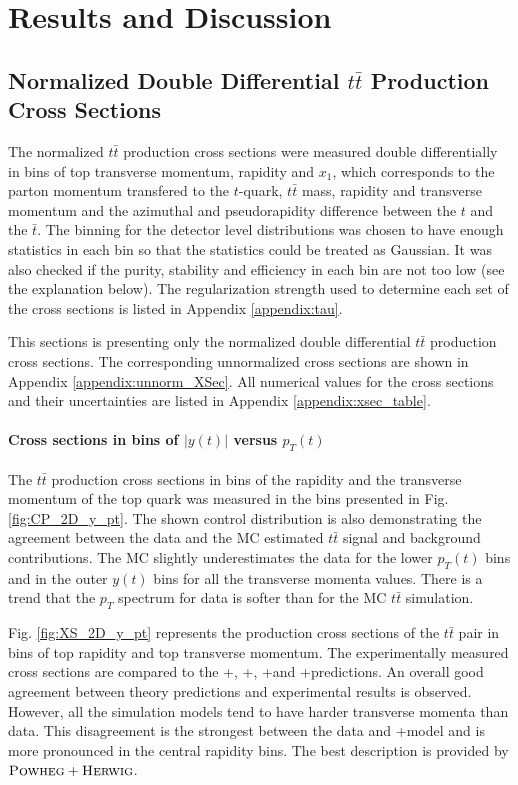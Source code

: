 \chapter{Results and Discussion}\label{chapt:results}

\section{Normalized Double Differential $t\bar{t}$ Production Cross Sections}\label{ssec:xsec_mes}

The normalized $t\bar{t}$ production cross sections were measured double differentially in bins of top transverse momentum, rapidity and  $x_{1}$,
which corresponds to the parton momentum transfered to the $t$-quark,
$t\bar{t}$ mass, rapidity and transverse momentum and the azimuthal and pseudorapidity difference between the $t$ and the $\bar{t}$.
The binning for the detector level distributions was chosen to have enough statistics in each bin so that the statistics could be treated as Gaussian.
It was also checked if the purity, stability and efficiency in each bin are not too low (see the explanation below).
The regularization strength used to determine each set of the cross sections is listed in Appendix \ref{appendix:tau}.

This sections is presenting only the normalized double differential $t\bar{t}$ production cross sections. The corresponding
unnormalized cross sections are shown in Appendix \ref{appendix:unnorm_XSec}. All numerical values for the cross sections
and their uncertainties are listed in Appendix \ref{appendix:xsec_table}.

\subsubsection{Cross sections in bins of $|y(t)|$ versus $p_{T}(t)$}

The $t\bar{t}$ production cross sections in bins of the rapidity and the transverse momentum of the top quark was
measured in the bins presented in Fig. \ref{fig:CP_2D_y_pt}. The shown control distribution is also demonstrating the agreement between 
the data and the MC estimated $t\bar{t}$ signal and background contributions. The MC slightly underestimates the data for 
the lower $p_{T}(t)$ bins and in the outer $y(t)$ bins for all the transverse momenta values. There is a trend that the $p_{T}$
spectrum for data is softer than for the MC $t\bar{t}$ simulation.

Fig. \ref{fig:XS_2D_y_pt} represents the production cross sections of the $t\bar{t}$ pair in bins of top rapidity and top transverse momentum.
The experimentally measured cross sections are compared to the \MG+\PYTHIA, \Powheg+\PYTHIA, \Powheg+\HERWIG and \MCNLO+\HERWIG predictions.
An overall good agreement between theory predictions and experimental results is observed. However, all the simulation models tend to have 
harder transverse momenta than data. This disagreement is the strongest between the data and \MG+\PYTHIA model and is more pronounced in the 
central rapidity bins. The best description is provided by $\textsc{Powheg}+\textsc{Herwig}$.

